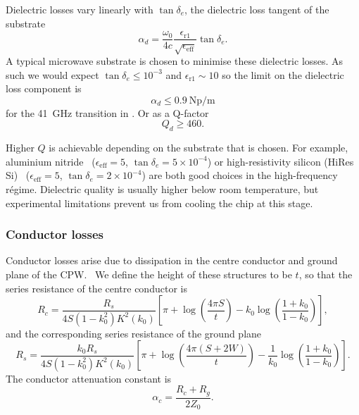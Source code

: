 Dielectric losses vary linearly with $\tan \delta_e$, the dielectric loss
tangent of the substrate~\cite{Collin2007}
\begin{equation}
  \alpha_d =
  \frac{\omega_0}{4c}\frac{\epsilon_\mathrm{r1}}{\sqrt{\epsilon_\mathrm{eff}}}
  \tan \delta_e.
\end{equation}
A typical microwave substrate is chosen to minimise these dielectric losses. As
such we would expect $\tan\delta_e\leq10^{-3}$ and
$\epsilon_\mathrm{r1} \sim 10$ so the limit on the dielectric loss component is
\begin{equation}
  \alpha_d \leq \SI{0.9}{\neper\per\meter}
\end{equation}
for the \SI{41}{\giga\hertz} transition in \CaF{}. Or as a Q-factor
\begin{equation}
  Q_d \geq 460.
\end{equation}

Higher $Q$ is achievable depending on the substrate that is chosen. For example,
aluminium nitride~\cite{mw101}  ($\epsilon_\mathrm{eff}=5$, $\tan\delta_e =
5\times10^{-4}$) or high-resistivity silicon (HiRes Si)~\cite{1717770}
($\epsilon_\mathrm{eff}=5$, $\tan\delta_e =2\times10^{-4}$) are both good
choices in the high-frequency r\'egime.  Dielectric quality is usually higher
below room temperature, but experimental limitations prevent us from cooling the
chip at this stage.

\subsubsection*{Conductor losses}

Conductor losses arise due to dissipation in the centre conductor and ground
plane of the CPW.~\cite{Simons2004} We define the height of these structures to
be $t$, so that the series resistance of the centre conductor is
\begin{equation}
  R_c = \frac{R_s}{4 S(1-k_0^2)K^2(k_0)}\left[ \pi + \log\left(\frac{4\pi
  S}{t}\right) - k_0\log\left(\frac{1+k_0}{1-k_0}\right) \right],
\end{equation}
and the corresponding series resistance of the ground plane
\begin{equation}
  R_s = \frac{k_0 R_s}{4S(1-k_0^2)K^2(k_0)}\left[\pi +
  \log\left(\frac{4\pi(S+2W)}{t}\right) -
  \frac{1}{k_0}\log\left(\frac{1+k_0}{1-k_0}\right)\right].
\end{equation}
The conductor attenuation constant is
\begin{equation}
  \alpha_c = \frac{R_c +R_g}{2Z_0}.
\end{equation}

